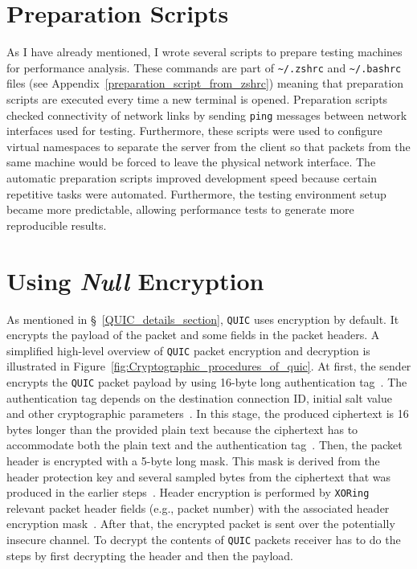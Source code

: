 \documentclass[12pt,a4paper]{report}
\begin{document}
\section{Preparation Scripts}
As I have already mentioned, I wrote several scripts to prepare testing machines for performance analysis.
These commands are part of \texttt{\textasciitilde/.zshrc} and \texttt{\textasciitilde/.bashrc} files (see Appendix~\ref{preparation_script_from_zshrc}) meaning that preparation scripts are executed every time a new terminal is opened.
Preparation scripts checked connectivity of network links by sending \texttt{ping} messages between network interfaces used for testing.
Furthermore, these scripts were used to configure virtual namespaces to separate the server from the client so that packets from the same machine would be forced to leave the physical network interface.
The automatic preparation scripts improved development speed because certain repetitive tasks were automated.
Furthermore, the testing environment setup became more predictable, allowing performance tests to generate more reproducible results.

















\section{Using \textit{Null} Encryption}

As mentioned in \S~\ref{QUIC_details_section}, \texttt{QUIC} uses encryption by default.
It encrypts the payload of the packet and some fields in the packet headers.
A simplified high-level overview of \texttt{QUIC} packet encryption and decryption is illustrated in Figure~\ref{fig:Cryptographic_procedures_of_quic}.
At first, the sender encrypts the \texttt{QUIC} packet payload by using 16-byte long authentication tag~\cite[Section 5]{ietf-quic-tls-32}. 
The authentication tag depends on the destination connection ID, initial salt value and other cryptographic parameters~\cite[Section 5]{ietf-quic-tls-32}.
In this stage, the produced ciphertext is 16 bytes longer than the provided plain text because the ciphertext has to accommodate both the plain text and the authentication tag~\cite[Section 5.3]{ietf-quic-tls-32}.
Then, the packet header is encrypted with a 5-byte long mask.
This mask is derived from the header protection key and several sampled bytes from the ciphertext that was produced in the earlier steps~\cite[Section 5]{ietf-quic-tls-32}. 
Header encryption is performed by \texttt{XORing} relevant packet header fields (e.g., packet number) with the associated header encryption mask~\cite[Section 5]{ietf-quic-tls-32}.
After that, the encrypted packet is sent over the potentially insecure channel.
To decrypt the contents of \texttt{QUIC} packets receiver has to do the steps by first decrypting the header and then the payload.
\end{document}
